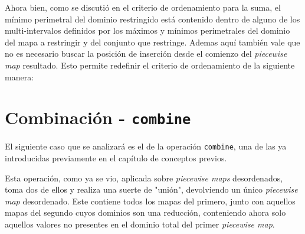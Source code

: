 Ahora bien, como se discutió en el criterio de ordenamiento para la suma, el mínimo perimetral del dominio restringido está contenido dentro de alguno de los multi-intervalos definidos por los máximos y mínimos perimetrales del dominio del mapa a restringir y del conjunto que restringe. Ademas aquí también vale que no es necesario buscar la posición de inserción desde el comienzo del \textit{piecewise map} resultado. Esto permite redefinir el criterio de ordenamiento de la siguiente manera:

\begin{center}
\end{center}


\section{Combinación - \texttt{combine}}

El siguiente caso que se analizará es el de la operación \texttt{combine}, una de las ya introducidas previamente en el capítulo de conceptos previos.

Esta operación, como ya se vio, aplicada sobre \textit{piecewise maps} desordenados, toma dos de ellos y realiza una suerte de "unión", devolviendo un único \textit{piecewise map} desordenado. Este contiene todos los mapas del primero, junto con aquellos mapas del segundo cuyos dominios son una reducción, conteniendo ahora solo aquellos valores no presentes en el dominio total del primer \textit{piecewise map}. 

